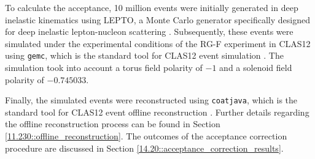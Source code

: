     To calculate the acceptance, 10 million events were initially generated in deep inelastic kinematics using LEPTO, a Monte Carlo generator specifically designed for deep inelastic lepton-nucleon scattering \cite{ingelman1997}.
    Subsequently, these events were simulated under the experimental conditions of the RG-F experiment in CLAS12 using \texttt{gemc}, which is the standard tool for CLAS12 event simulation \cite{ungaro2020gemc}.
    The simulation took into account a torus field polarity of $-1$ and a solenoid field polarity of $-0.745033$.

    Finally, the simulated events were reconstructed using \texttt{coatjava}, which is the standard tool for CLAS12 event offline reconstruction \cite{ziegler2020}.
    Further details regarding the offline reconstruction process can be found in Section \ref{11.230::offline_reconstruction}.
    The outcomes of the acceptance correction procedure are discussed in Section \ref{14.20::acceptance_correction_results}.


